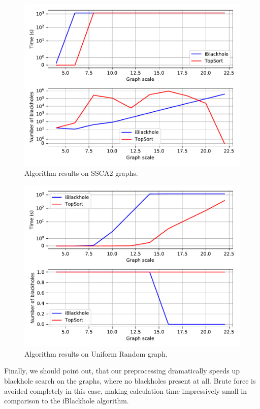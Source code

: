 \documentclass{svproc}
\begin{document}
\begin{figure}[H]
	\includegraphics[width=\linewidth]{ssca2.pdf}
	\caption{Algorithm results on SSCA2 graphs.}
	\label{fig:ssca2}
\end{figure}
\begin{figure}[H]
	\includegraphics[width=\linewidth]{ur.pdf}
	\caption{Algorithm results on Uniform Random graph.}
	\label{fig:ur}
\end{figure}

Finally, we should point out, that our preprocessing dramatically speeds up blackhole search on the graphs, where no blackholes present at all. Brute force is
avoided completely in this case, making calculation time impressively small in comparison to the iBlackhole algorithm.
\end{document}
